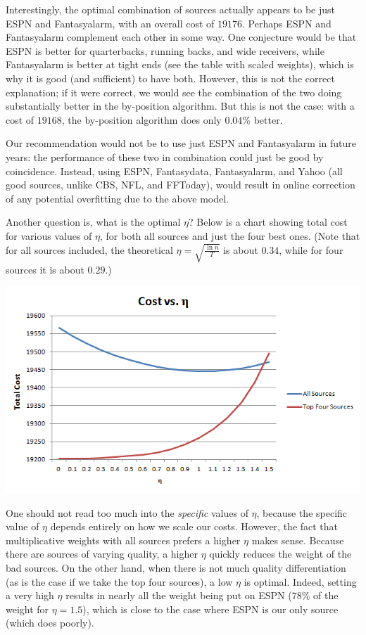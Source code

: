\documentclass[12pt, final, onecolumn, titlepage]{article}
\theoremstyle{definition}
\begin{document}
Interestingly, the optimal combination of sources actually appears to be just ESPN and Fantasyalarm, with an overall cost of $19176$. Perhaps ESPN and Fantasyalarm complement each other in some way. One conjecture would be that ESPN is better for quarterbacks, running backs, and wide receivers, while Fantasyalarm is better at tight ends (see the table with scaled weights), which is why it is good (and sufficient) to have both. However, this is not the correct explanation; if it were correct, we would see the combination of the two doing substantially better in the by-position algorithm. But this is not the case: with a cost of $19168$, the by-position algorithm does only $0.04\%$ better.

Our recommendation would not be to use just ESPN and Fantasyalarm in future years: the performance of these two in combination could just be good by coincidence. Instead, using ESPN, Fantasydata, Fantasyalarm, and Yahoo (all good sources, unlike CBS, NFL, and FFToday), would result in online correction of any potential overfitting due to the above model.

Another question is, what is the optimal $\eta$? Below is a chart showing total cost for various values of $\eta$, for both all sources and just the four best ones. (Note that for all sources included, the theoretical $\eta = \sqrt{\frac{\ln n}{T}}$ is about $0.34$, while for four sources it is about $0.29$.)
\begin{center}
\includegraphics[scale=0.7]{Cost_vs_eta.png}
\end{center}
One should not read too much into the \emph{specific} values of $\eta$, because the specific value of $\eta$ depends entirely on how we scale our costs. However, the fact that multiplicative weights with all sources prefers a higher $\eta$ makes sense. Because there are sources of varying quality, a higher $\eta$ quickly reduces the weight of the bad sources. On the other hand, when there is not much quality differentiation (as is the case if we take the top four sources), a low $\eta$ is optimal. Indeed, setting a very high $\eta$ results in nearly all the weight being put on ESPN ($78\%$ of the weight for $\eta = 1.5$), which is close to the case where ESPN is our only source (which does poorly).
\end{document}
